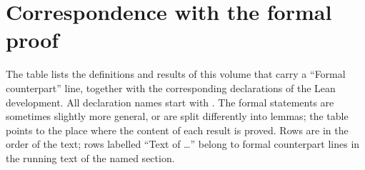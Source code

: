 \chapter{Correspondence with the formal proof}\label{app:formal}

The table lists the definitions and results of this volume that carry a ``Formal counterpart''
line, together with the corresponding declarations of the Lean development. All declaration
names start with . The formal statements are sometimes slightly more general, or are
split differently into lemmas; the table points to the place where the content of each result is
proved. Rows are in the order of the text; rows labelled ``Text of \dots'' belong to formal counterpart lines in the
running text of the named section.

